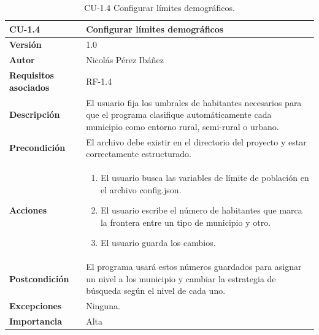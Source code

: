 \begin{table}[p]
	\centering
	\begin{tabularx}{\linewidth}{ p{} p{} }
		\toprule
		\textbf{CU-1.4}    & \textbf{Configurar límites demográficos}\\
		\toprule
		\textbf{Versión}              & 1.0    \\
		\textbf{Autor}                & Nicolás Pérez Ibáñez \\
		\textbf{Requisitos asociados} & RF-1.4 \\
		\textbf{Descripción}          & El usuario fija los umbrales de habitantes necesarios para que el programa clasifique automáticamente cada municipio como entorno rural, semi-rural o urbano. \\
		\textbf{Precondición}         & El archivo \ruta{config/config.json} debe existir en el directorio del proyecto y estar correctamente estructurado. \\
		\textbf{Acciones}             &
		\begin{enumerate}
			\def\labelenumi{\arabic{enumi}.}
			\tightlist
			\item El usuario busca las variables de límite de población en el archivo config.json.
			\item El usuario escribe el número de habitantes que marca la frontera entre un tipo de municipio y otro.
			\item El usuario guarda los cambios.
		\end{enumerate}\\
		\textbf{Postcondición}        & El programa usará estos números guardados para asignar un nivel a los municipio y cambiar la estrategia de búsqueda según el nivel de cada uno. \\
		\textbf{Excepciones}          & Ninguna. \\
		\textbf{Importancia}          & Alta \\
		\bottomrule
	\end{tabularx}
	\caption{CU-1.4 Configurar límites demográficos.}
\end{table}

